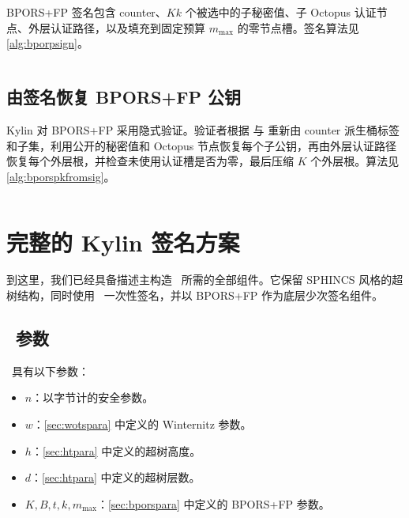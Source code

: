 BPORS+FP 签名包含 counter、$Kk$ 个被选中的子秘密值、子 Octopus 认证节点、外层认证路径，以及填充到固定预算 $m_{\max}$ 的零节点槽。签名算法见 \cref{alg:bporpsign}。

\begin{algorithm}
    \inputminted[breaklines,linenos,tabsize=2,mathescape,escapeinside=||]{C}{paper/code/bpors_sign.cs}
    \caption{\texttt{bpors\_sign} --- 生成 BPORS+FP 签名和公钥。}
    \label{alg:bporpsign}
\end{algorithm}

\subsection{由签名恢复 BPORS+FP 公钥}

Kylin 对 BPORS+FP 采用隐式验证。验证者根据 \sigbpors 与 \md 重新由 counter 派生桶标签和子集，利用公开的秘密值和 Octopus 节点恢复每个子公钥，再由外层认证路径恢复每个外层根，并检查未使用认证槽是否为零，最后压缩 $K$ 个外层根。算法见 \cref{alg:bporspkfromsig}。

\begin{algorithm}
    \inputminted[breaklines,linenos,tabsize=2,mathescape,escapeinside=||]{C}{paper/code/bpors_pkFromSig.cs}
    \caption{\texttt{bpors\_pkFromSig} --- 由 BPORS+FP 签名恢复 BPORS+FP 公钥。}
    \label{alg:bporspkfromsig}
\end{algorithm}


\section{完整的 Kylin 签名方案}
\label{sec:spx-core}
到这里，我们已经具备描述主构造 \SPHINCSA\ 所需的全部组件。它保留 SPHINCS 风格的超树结构，同时使用 \WOTSCS\ 一次性签名，并以 BPORS+FP 作为底层少次签名组件。

\subsection{\SPHINCSA\ 参数}

\SPHINCSA\ 具有以下参数：

\begin{itemize}

    \item $n$：以字节计的安全参数。

    \item $w$：\cref{sec:wotspara} 中定义的 Winternitz 参数。

    \item $h$：\cref{sec:htpara} 中定义的超树高度。

    \item $d$：\cref{sec:htpara} 中定义的超树层数。

    \item $K,B,t,k,m_{\max}$：\cref{sec:bporspara} 中定义的 BPORS+FP 参数。

\end{itemize}

